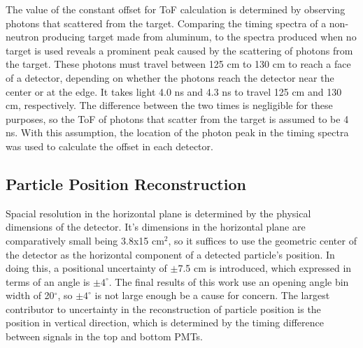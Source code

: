 %
The value of the constant offset for ToF calculation is determined by observing photons that scattered from the target.
Comparing the timing spectra of a non-neutron producing target made from aluminum, to the spectra produced when no target is used reveals a prominent peak caused by the scattering of photons from the target.
These photons must travel between 125 cm to 130 cm to reach a face of a detector, depending on whether the photons reach the detector near the center or at the edge.
It takes light 4.0 ns and 4.3 ns to travel 125 cm and 130 cm, respectively.
The difference between the two times is negligible for these purposes, so the ToF of photons that scatter from the target is assumed to be 4 ns.
With this assumption, the location of the photon peak in the timing spectra was used to calculate the offset in each detector.
   
\subsection{Particle Position Reconstruction}
Spacial resolution in the horizontal plane is determined by the physical dimensions of the detector.
It's dimensions in the horizontal plane are comparatively small being 3.8x15 cm$^2$, so it suffices to use the geometric center of the detector as the horizontal component of a detected particle's position.
In doing this, a positional uncertainty of $\pm$7.5 cm is introduced, which expressed in terms of an angle is $\pm4^{\circ}$.
The final results of this work use an opening angle bin width of 20$^{\circ}$, so $\pm4^{\circ}$ is not large enough be a cause for concern.
The largest contributor to uncertainty in the reconstruction of particle position is the position in vertical direction, which is determined by the timing difference between signals in the top and bottom PMTs.

